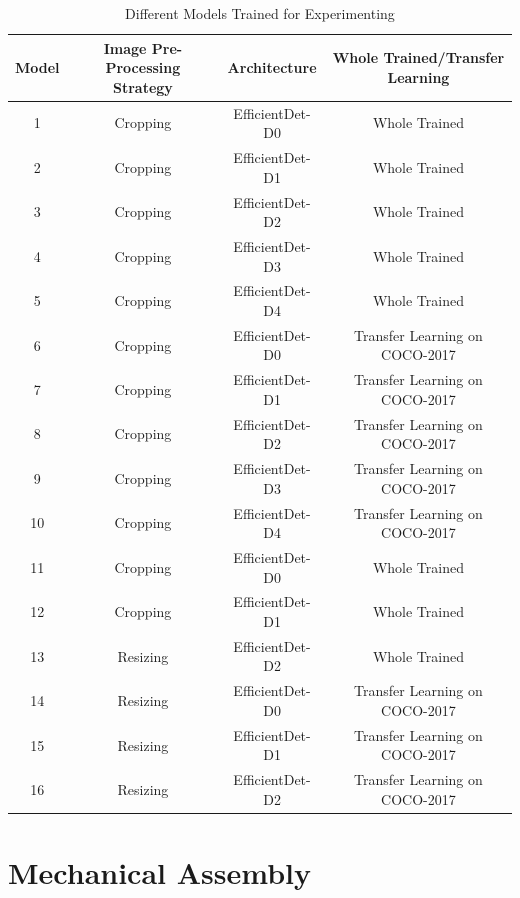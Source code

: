 \documentclass[openright]{normas-utf-tex} %
\begin{document}
\begin{table}[H]
	\centering
	\begin{adjustbox}{width=1\textwidth}
	\label{tab:modelsTrained}
	\begin{tabular}{c|c|c|c}
		\hline 
		Model & Image Pre-Processing Strategy & Architecture & Whole Trained/Transfer Learning \\
		\hline
        1 & Cropping & EfficientDet-D0 & Whole Trained \\
		2 & Cropping & EfficientDet-D1 & Whole Trained \\
		3 & Cropping & EfficientDet-D2 & Whole Trained \\
		4 & Cropping & EfficientDet-D3 & Whole Trained \\
		5 & Cropping & EfficientDet-D4 & Whole Trained \\
		6 & Cropping & EfficientDet-D0 & Transfer Learning on COCO-2017 \\
		7 & Cropping & EfficientDet-D1 & Transfer Learning on COCO-2017 \\
		8 & Cropping & EfficientDet-D2 & Transfer Learning on COCO-2017 \\
		9 & Cropping & EfficientDet-D3 & Transfer Learning on COCO-2017 \\
		10 & Cropping & EfficientDet-D4 & Transfer Learning on COCO-2017 \\
		11 & Cropping & EfficientDet-D0 & Whole Trained \\
		12 & Cropping & EfficientDet-D1 & Whole Trained \\
		13 & Resizing & EfficientDet-D2 & Whole Trained \\
		14 & Resizing & EfficientDet-D0 & Transfer Learning on COCO-2017 \\
		15 & Resizing & EfficientDet-D1 & Transfer Learning on COCO-2017 \\
		16 & Resizing & EfficientDet-D2 & Transfer Learning on COCO-2017 \\
		\hline 
	\end{tabular}
	\end{adjustbox}
	\caption[Different Models Trained for Experimenting]{Different Models Trained for Experimenting}
	\label{tbl:modelsTrainedTab}
\end{table}

\section{Mechanical Assembly}
\end{document}
